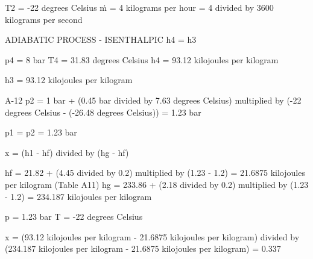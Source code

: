 T2 = -22 degrees Celsius  
ṁ = 4 kilograms per hour = 4 divided by 3600 kilograms per second  

ADIABATIC PROCESS - ISENTHALPIC  
h4 = h3  

p4 = 8 bar  
T4 = 31.83 degrees Celsius  
h4 = 93.12 kilojoules per kilogram  

h3 = 93.12 kilojoules per kilogram  

A-12  
p2 = 1 bar + (0.45 bar divided by 7.63 degrees Celsius) multiplied by (-22 degrees Celsius - (-26.48 degrees Celsius))  
= 1.23 bar  

p1 = p2 = 1.23 bar  

x = (h1 - hf) divided by (hg - hf)  

hf = 21.82 + (4.45 divided by 0.2) multiplied by (1.23 - 1.2) = 21.6875 kilojoules per kilogram (Table A11)  
hg = 233.86 + (2.18 divided by 0.2) multiplied by (1.23 - 1.2) = 234.187 kilojoules per kilogram  

p = 1.23 bar  
T = -22 degrees Celsius  

x = (93.12 kilojoules per kilogram - 21.6875 kilojoules per kilogram) divided by (234.187 kilojoules per kilogram - 21.6875 kilojoules per kilogram) = 0.337